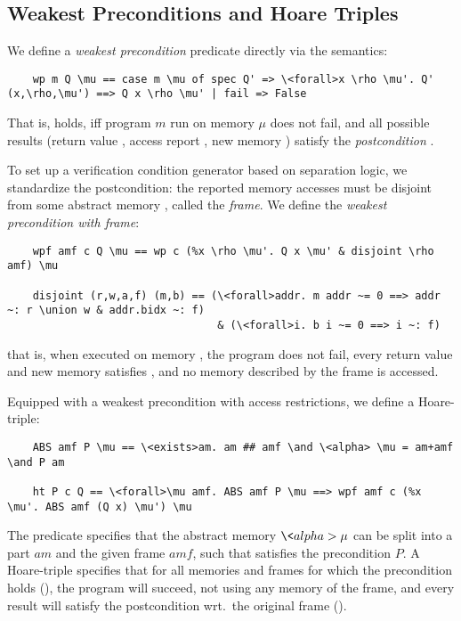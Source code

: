 \documentclass[a4paper,UKenglish,cleveref, autoref, thm-restate]{lipics-v2021}
\begin{document}
  \subsection{Weakest Preconditions and Hoare Triples}\label{sec:wp_hoare}
  We define a \emph{weakest precondition} predicate directly via the semantics:
  \begin{lstlisting}
    wp m Q \mu == case m \mu of spec Q' => \<forall>x \rho \mu'. Q' (x,\rho,\mu') ==> Q x \rho \mu' | fail => False
  \end{lstlisting}
  That is,  holds, iff program \is$m$ run on memory \is$\mu$ does not fail, and all possible results (return value , access report \is{\rho}, new memory )
  satisfy the \emph{postcondition} .

  To set up a verification condition generator based on separation logic,
  we standardize the postcondition: the reported memory accesses must be disjoint
  from some abstract memory , called the \emph{frame}. We define the
  \emph{weakest precondition with frame}:
  \begin{lstlisting}
    wpf amf c Q \mu == wp c (%x \rho \mu'. Q x \mu' & disjoint \rho amf) \mu

    disjoint (r,w,a,f) (m,b) == (\<forall>addr. m addr ~= 0 ==> addr ~: r \union w & addr.bidx ~: f)
                                 & (\<forall>i. b i ~= 0 ==> i ~: f)
  \end{lstlisting}
  that is, when executed on memory \is{\mu}, the program  does not fail, every return value  and new memory  satisfies ,
  and no memory described by the frame  is accessed.

  Equipped with a weakest precondition with access restrictions, we define a Hoare-triple:
  \begin{lstlisting}
    ABS amf P \mu == \<exists>am. am ## amf \and \<alpha> \mu = am+amf \and P am

    ht P c Q == \<forall>\mu amf. ABS amf P \mu ==> wpf amf c (%x \mu'. ABS amf (Q x) \mu') \mu
  \end{lstlisting}
  The predicate  specifies that the abstract memory \is$\<alpha> \mu$ can be
  split into a part \is$am$ and the given frame \is$amf$, such that  satisfies the precondition $P$.
  A Hoare-triple  specifies that for all memories and frames
  for which the precondition holds (), the program will succeed,
  not using any memory of the frame, and every result will satisfy the postcondition
  wrt.\ the original frame ().
\end{document}
